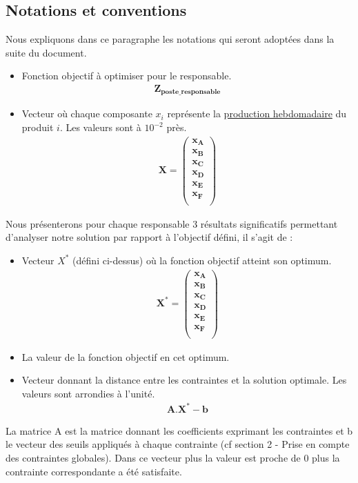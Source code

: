 \documentclass[12pt]{article}
\begin{document}
\subsection{Notations et conventions}
Nous expliquons dans ce paragraphe les notations qui seront adoptées dans la suite du document.
\begin{itemize}
\item Fonction objectif à optimiser pour le responsable.
\begin{align*} 
	\boldsymbol{Z_{poste\_responsable}}
\end{align*}
\item Vecteur où chaque composante $x_{i}$ représente la \underline{production hebdomadaire} du produit $i$. Les valeurs sont à $10^{-2}$ près.
\begin{align*} 
	\boldsymbol{X = 
   \left (
   \begin{array}{c}
      x_{A} \\
      x_{B} \\
      x_{C} \\
      x_{D} \\
      x_{E} \\
      x_{F} \\
   \end{array}
   \right )}
\end{align*}
\end{itemize}
Nous présenterons pour chaque responsable 3 résultats significatifs permettant d'analyser notre solution par rapport à l'objectif défini, il s'agit de :
\begin{itemize}
\item Vecteur $X^{*}$ (défini ci-dessus) où la fonction objectif atteint son optimum.
\begin{align*}
\boldsymbol{X^{*} = 
   \left (
   \begin{array}{c}
      x_{A} \\
      x_{B} \\
      x_{C} \\
      x_{D} \\
      x_{E} \\
      x_{F} \\
   \end{array}
   \right )}
 \end{align*}
 \item La valeur de la fonction objectif en cet optimum.
 \item Vecteur donnant la distance entre les contraintes et la solution optimale. Les valeurs sont arrondies à l'unité.
 \begin{align*} 
 \boldsymbol{A.X^{*}-b}
 \end{align*}
\end{itemize}
La matrice A est la matrice donnant les coefficients exprimant les contraintes et b le vecteur des seuils appliqués à chaque contrainte (cf section 2 - Prise en compte des contraintes globales). Dans ce vecteur plus la valeur est proche de 0 plus la contrainte correspondante a été satisfaite. 
\end{document}

